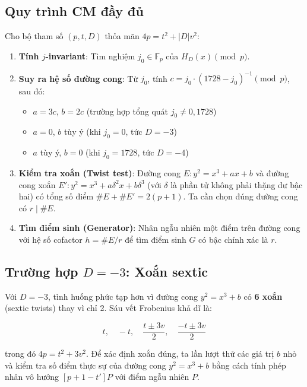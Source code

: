 \subsection{Quy trình CM đầy
đủ}\label{quy-truxecnh-cm-ux111ux1ea7y-ux111ux1ee7}

Cho bộ tham số \((p, t, D)\) thỏa mãn \(4p = t^2 + |D|v^2\):

\begin{enumerate}
\def\labelenumi{\arabic{enumi}.}
\tightlist
\item
  \textbf{Tính \(j\)-invariant}: Tìm nghiệm \(j_0 \in \mathbb{F}_p\) của
  \(H_D(x) \pmod{p}\).
\item
  \textbf{Suy ra hệ số đường cong}: Từ \(j_0\), tính
  \(c = j_0 \cdot (1728 - j_0)^{-1} \pmod{p}\), sau đó:

  \begin{itemize}
  \tightlist
  \item
    \(a = 3c\), \(b = 2c\) (trường hợp tổng quát \(j_0 \neq 0, 1728\))
  \item
    \(a = 0\), \(b\) tùy ý (khi \(j_0 = 0\), tức \(D = -3\))
  \item
    \(a\) tùy ý, \(b = 0\) (khi \(j_0 = 1728\), tức \(D = -4\))
  \end{itemize}
\item
  \textbf{Kiểm tra xoắn (Twist test)}: Đường cong
  \(E: y^2 = x^3 + ax + b\) và đường cong xoắn
  \(E': y^2 = x^3 + a\delta^2 x + b\delta^3\) (với \(\delta\) là phần tử
  không phải thặng dư bậc hai) có tổng số điểm \(\#E + \#E' = 2(p+1)\).
  Ta cần chọn đúng đường cong có \(r \mid \#E\).
\item
  \textbf{Tìm điểm sinh (Generator)}: Nhân ngẫu nhiên một điểm trên
  đường cong với hệ số cofactor \(h = \#E / r\) để tìm điểm sinh \(G\)
  có bậc chính xác là \(r\).
\end{enumerate}

\subsection{\texorpdfstring{Trường hợp \(D = -3\): Xoắn
sextic}{Trường hợp D = -3: Xoắn sextic}}\label{trux1b0ux1eddng-hux1ee3p-d--3-xoux1eafn-sextic}

Với \(D = -3\), tình huống phức tạp hơn vì đường cong \(y^2 = x^3 + b\)
có \textbf{6 xoắn} (sextic twists) thay vì chỉ 2. Sáu vết Frobenius khả
dĩ là:

\[t, \quad -t, \quad \frac{t \pm 3v}{2}, \quad \frac{-t \pm 3v}{2}\]

trong đó \(4p = t^2 + 3v^2\). Để xác định xoắn đúng, ta lần lượt thử các
giá trị \(b\) nhỏ và kiểm tra số điểm thực sự của đường cong
\(y^2 = x^3 + b\) bằng cách tính phép nhân vô hướng \([p+1-t']P\) với
điểm ngẫu nhiên \(P\).

